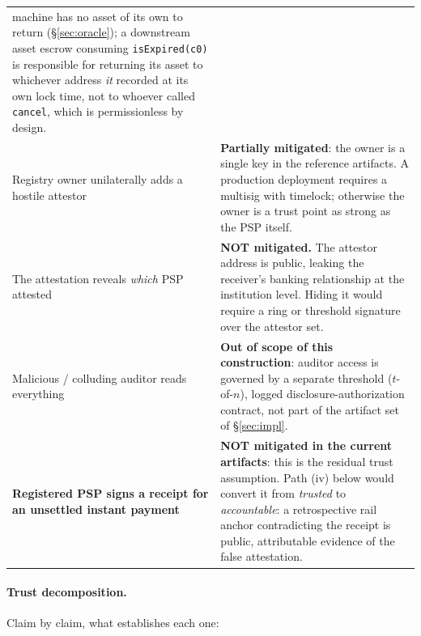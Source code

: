 \documentclass[11pt]{article}
\newcommand{\code}[1]{\texttt{#1}}
\begin{document}
{\begin{longtable}{@{}p{}p{}@{}}
machine has no asset of its own to return (\S\ref{sec:oracle}); a downstream
asset escrow consuming \code{isExpired(c0)} is responsible for returning its
asset to whichever address \emph{it} recorded at its own lock time, not to
whoever called \code{cancel}, which is permissionless by design. \\[2pt]
Registry owner unilaterally adds a hostile attestor
& \textbf{Partially mitigated}: the owner is a single key in the reference
artifacts. A production deployment requires a multisig with timelock; otherwise
the owner is a trust point as strong as the PSP itself. \\[2pt]
The attestation reveals \emph{which} PSP attested
& \textbf{NOT mitigated.} The attestor address is public, leaking the receiver's
banking relationship at the institution level. Hiding it would require a ring or
threshold signature over the attestor set. \\[2pt]
Malicious / colluding auditor reads everything
& \textbf{Out of scope of this construction}: auditor access is governed by a
separate threshold ($t$-of-$n$), logged disclosure-authorization contract,
not part of the artifact set of \S\ref{sec:impl}. \\[2pt]
\textbf{Registered PSP signs a receipt for an unsettled instant payment}
& \textbf{NOT mitigated in the current artifacts}: this is the residual trust
assumption. Path (iv) below would convert it from \emph{trusted} to
\emph{accountable}: a retrospective rail anchor contradicting the receipt is
public, attributable evidence of the false attestation. \\
\end{longtable}}

\paragraph{Trust decomposition.} Claim by claim, what establishes each one:
\end{document}
